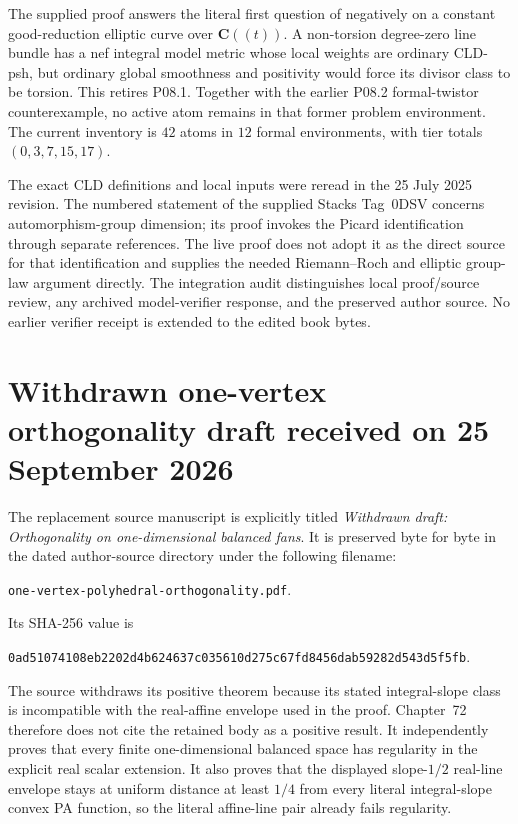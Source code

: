 The supplied proof answers the literal first question of
\cite[Remark~17.8.10]{CLD25} negatively on a constant good-reduction
elliptic curve over \(\mathbf C((t))\).  A non-torsion degree-zero line bundle
has a nef integral model metric whose local weights are ordinary CLD-psh,
but ordinary global smoothness and positivity would force its divisor class
to be torsion.  This retires P08.1.  Together with the earlier P08.2
formal-twistor counterexample, no active atom remains in that former problem
environment.  The current inventory is \(42\) atoms in \(12\) formal
environments, with tier totals \((0,3,7,15,17)\).

The exact CLD definitions and local inputs were reread in the 25 July 2025
revision. The numbered statement of the supplied Stacks Tag~0DSV concerns
automorphism-group dimension; its proof invokes the Picard identification
through separate references. The live proof does not adopt it as the direct
source for that identification and supplies the needed Riemann--Roch and
elliptic group-law argument directly. The integration
audit distinguishes local proof/source review, any archived model-verifier
response, and the preserved author source.  No earlier verifier receipt is
extended to the edited book bytes.

\section{Withdrawn one-vertex orthogonality draft received on
25 September 2026}
\label{sec:provenance-supplied-p052-20260925}

The replacement source manuscript \cite{SuppliedP05220260925} is explicitly
titled \emph{Withdrawn draft: Orthogonality on one-dimensional balanced
fans}.  It is preserved byte for byte in the dated author-source directory
under the following filename:
\begin{center}
\small
\nolinkurl{one-vertex-polyhedral-orthogonality.pdf}.
\end{center}
Its SHA-256 value is
\begin{center}
\small
\nolinkurl{0ad51074108eb2202d4b624637c035610d275c67fd8456dab59282d543d5f5fb}.
\end{center}
The source withdraws its positive theorem because its stated
integral-slope class is incompatible with the real-affine envelope used in
the proof.  Chapter~72 therefore does not cite the retained body as a
positive result.  It independently proves that every finite
one-dimensional balanced space has regularity in the explicit real scalar
extension.  It also proves that the displayed slope-\(1/2\) real-line envelope
stays at uniform distance at least \(1/4\) from every literal integral-slope
convex PA function, so the literal affine-line pair already fails
regularity.

